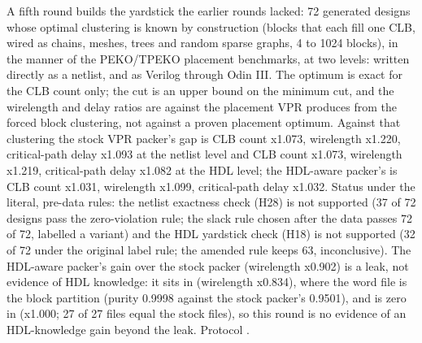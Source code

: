 
A fifth round builds the yardstick the earlier rounds lacked: 72 generated designs whose optimal clustering is known by construction (blocks that each fill one CLB, wired as chains, meshes, trees and random sparse graphs, 4 to 1024 blocks), in the manner of the PEKO/TPEKO placement benchmarks, at two levels: written directly as a netlist, and as Verilog through Odin III. The optimum is exact for the CLB count only; the cut is an upper bound on the minimum cut, and the wirelength and delay ratios are against the placement VPR produces from the forced block clustering, not against a proven placement optimum. Against that clustering the stock VPR packer's gap is CLB count x1.073, wirelength x1.220, critical-path delay x1.093 at the netlist level and CLB count x1.073, wirelength x1.219, critical-path delay x1.082 at the HDL level; the HDL-aware packer's is CLB count x1.031, wirelength x1.099, critical-path delay x1.032. Status under the literal, pre-data rules: the netlist exactness check (H28) is not supported (37 of 72 designs pass the zero-violation rule; the slack rule chosen after the data passes 72 of 72, labelled a variant) and the HDL yardstick check (H18) is not supported (32 of 72 under the original label rule; the amended rule keeps 63, inconclusive). The HDL-aware packer's gain over the stock packer (wirelength x0.902) is a leak, not evidence of HDL knowledge: it sits in  (wirelength x0.834), where the word file is the block partition (purity 0.9998 against the stock packer's 0.9501), and is zero in  (x1.000; 27 of 27  files equal the stock files), so this round is no evidence of an HDL-knowledge gain beyond the leak. Protocol .
